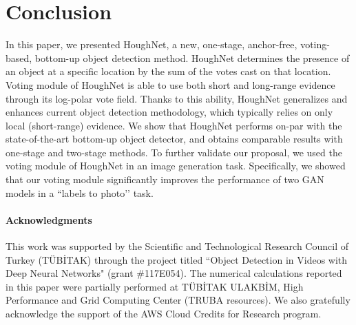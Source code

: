 \documentclass[runningheads]{llncs}
\begin{document}
\section{Conclusion}





In this paper, we presented HoughNet, a new, one-stage, anchor-free, voting-based, bottom-up object detection method.  HoughNet determines the presence of an object at a specific location by the sum of the votes cast on that location. Voting module of HoughNet is able to use both short and long-range evidence through its log-polar vote field. Thanks to this ability, HoughNet generalizes and enhances current object detection methodology, which typically relies on only local (short-range) evidence.  We show that HoughNet performs on-par with the state-of-the-art  bottom-up object detector, and obtains comparable results with one-stage and two-stage methods. To further validate our proposal, we used the voting module of HoughNet in an image generation task. Specifically, we showed that our voting module significantly improves the performance of two GAN models in a ``labels to photo’’ task. 


\paragraph*{\textbf{Acknowledgments}}
This work was supported by the Scientific and Technological Research Council of Turkey (T\"{U}B\.{I}TAK) through the project titled ``Object Detection in Videos with Deep Neural Networks" (grant \#117E054). The numerical calculations reported in this paper were partially performed at T\"{U}B\.{I}TAK ULAKB\.{I}M, High Performance and Grid Computing Center (TRUBA resources). We also gratefully acknowledge the support of the AWS Cloud Credits for Research program. 






\setlength\intextsep{8mm}


\clearpage 


{\small


}
\end{document}
